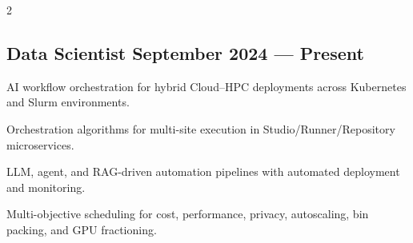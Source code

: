 \begin{multicols}{2}
\subsection{Data Scientist \hfill September 2024 --- Present}
\begin{zitemize}
\item AI workflow orchestration for hybrid Cloud--HPC deployments across Kubernetes and Slurm environments.
\item Orchestration algorithms for multi-site execution in Studio/Runner/Repository microservices.
\item LLM, agent, and RAG-driven automation pipelines with automated deployment and monitoring.
\item Multi-objective scheduling for cost, performance, privacy, autoscaling, bin packing, and GPU fractioning.
\end{zitemize}


\end{multicols}
